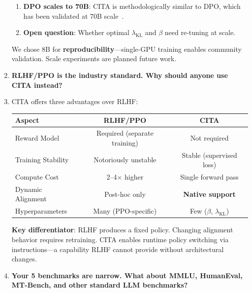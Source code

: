 \begin{enumerate}[label=\textbf{Q\arabic*.}, leftmargin=*, itemsep=8pt]
\begin{enumerate}[leftmargin=*,itemsep=2pt]
    \item \textbf{DPO scales to 70B}: CITA is methodologically similar to DPO, which has been validated at 70B scale~\cite{rafailov2023direct}.

    \item \textbf{Open question}: Whether optimal $\lambda_{\text{KL}}$ and $\beta$ need re-tuning at scale.
\end{enumerate}

We chose 8B for \textbf{reproducibility}---single-GPU training enables community validation. Scale experiments are planned future work.

\vspace{4mm}

\item[\ding{93}] \textbf{RLHF/PPO is the industry standard. Why should anyone use CITA instead?}

\item[\ding{224}] CITA offers three advantages over RLHF:

\begin{table}[H]
\centering
\small
\begin{tabular}{@{}lcc@{}}
\toprule
\textbf{Aspect} & \textbf{RLHF/PPO} & \textbf{CITA} \\
\midrule
Reward Model & Required (separate training) & Not required \\
\hline
Training Stability & Notoriously unstable & Stable (supervised loss) \\
\hline
Compute Cost & 2--4$\times$ higher & Single forward pass \\
\hline
Dynamic Alignment & Post-hoc only & \textbf{Native support} \\
\hline
Hyperparameters & Many (PPO-specific) & Few ($\beta$, $\lambda_{\text{KL}}$) \\
\bottomrule
\end{tabular}
\end{table}

\textbf{Key differentiator}: RLHF produces a fixed policy. Changing alignment behavior requires retraining. CITA enables runtime policy switching via instructions---a capability RLHF cannot provide without architectural changes.

\vspace{4mm}

\item[\ding{93}] \textbf{Your 5 benchmarks are narrow. What about MMLU, HumanEval, MT-Bench, and other standard LLM benchmarks?}


\end{enumerate}
